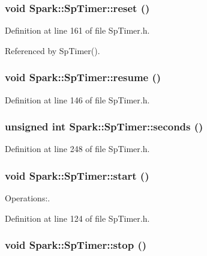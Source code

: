 \subsubsection{\setlength{\rightskip}{0pt plus 5cm}void Spark::Sp\-Timer::reset ()\hspace{0.3cm}{\tt  [inline]}}\label{classSpark_1_1SpTimer_a6}


Definition at line 161 of file Sp\-Timer.h.

Referenced by Sp\-Timer().
\subsubsection{\setlength{\rightskip}{0pt plus 5cm}void Spark::Sp\-Timer::resume ()\hspace{0.3cm}{\tt  [inline]}}\label{classSpark_1_1SpTimer_a5}


Definition at line 146 of file Sp\-Timer.h.
\subsubsection{\setlength{\rightskip}{0pt plus 5cm}unsigned int Spark::Sp\-Timer::seconds ()\hspace{0.3cm}{\tt  [inline]}}\label{classSpark_1_1SpTimer_a14}


Definition at line 248 of file Sp\-Timer.h.
\subsubsection{\setlength{\rightskip}{0pt plus 5cm}void Spark::Sp\-Timer::start ()\hspace{0.3cm}{\tt  [inline]}}\label{classSpark_1_1SpTimer_a2}


Operations:. 

Definition at line 124 of file Sp\-Timer.h.
\subsubsection{\setlength{\rightskip}{0pt plus 5cm}void Spark::Sp\-Timer::stop ()\hspace{0.3cm}{\tt  [inline]}}\label{classSpark_1_1SpTimer_a3}


